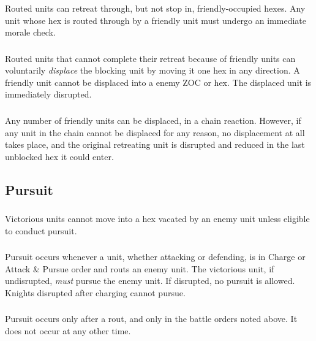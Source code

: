 \subsubsection[Routed Units]{} Routed units can retreat through, but not stop in, friendly-occupied hexes. Any unit whose hex is routed through by a friendly unit must undergo an immediate morale check.

\subsubsection[Blocked Retreat]{} Routed units that cannot complete their retreat because of friendly units can voluntarily \textit{displace} the blocking unit by moving it one hex in any direction. A friendly unit cannot be displaced into a enemy ZOC or hex. The displaced unit is immediately disrupted.

\subsubsection[Displacement]{} Any number of friendly units can be displaced, in a chain reaction. However, if any unit in the chain cannot be displaced for any reason, no displacement at all takes place, and the original retreating unit is disrupted and reduced in the last unblocked hex it could enter.

\subsection{Pursuit}

\subsubsection[No Advance]{} Victorious units cannot move into a hex vacated by an enemy unit unless eligible to conduct pursuit.

\subsubsection[When Pursuit Occurs]{} Pursuit occurs whenever a unit, whether attacking or defending, is in Charge or Attack \& Pursue order and routs an enemy unit. The victorious unit, if undisrupted, \textit{must} pursue the enemy unit. If disrupted, no pursuit is allowed. Knights disrupted after charging cannot pursue.

\subsubsection[After Rout]{} Pursuit occurs only after a rout, and only in the battle orders noted above. It does not occur at any other time.

